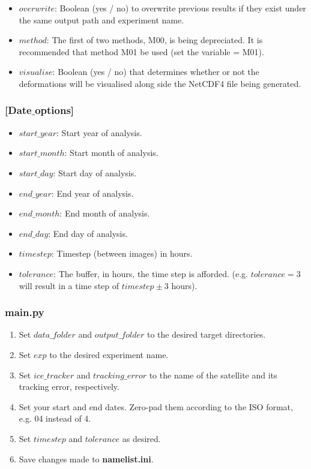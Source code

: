 \documentclass[12pt]{article}
\begin{document}
\begin{itemize}
    \item $overwrite$: Boolean (yes / no) to overwrite previous results if they exist under the same output path and experiment name.
    \item $method$: The first of two methods, M00, is being depreciated. It is recommended that method M01 be used (set the variable = M01).
    \item $visualise$: Boolean (yes / no) that determines whether or not the deformations will be visualised along side the NetCDF4 file being generated.
\end{itemize}

\subsubsection*{[Date$\_$options]}

\begin{itemize}
    \item $start\_year$: Start year of analysis. 
    \item $start\_month$: Start month of analysis.
    \item $start\_day$: Start day of analysis.
    \item $end\_year$: End year of analysis.
    \item $end\_month$: End month of analysis.
    \item $end\_day$: End day of analysis.
    \item $timestep$: Timestep (between images) in hours.
    \item $tolerance$: The buffer, in hours, the time step is afforded. (e.g. $tolerance = 3$ will result in a time step of $timestep \pm 3$ hours).
\end{itemize}

\subsubsection*{\textbf{main.py}}

\begin{enumerate}
    \item Set $data\_folder$ and $output\_folder$ to the desired target directories.
    \item Set $exp$ to the desired experiment name.
    \item Set $ice\_tracker$ and $tracking\_error$ to the name of the satellite and its tracking error, respectively.
    \item Set your start and end dates. Zero-pad them according to the ISO format, e.g. 04 instead of 4.
    \item Set $timestep$ and $tolerance$ as desired.
    \item Save changes made to \textbf{namelist.ini}.
\end{enumerate}
\end{document}

